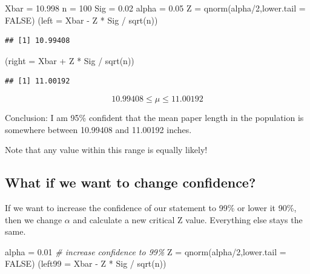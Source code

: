 \documentclass[
]{book}
\newenvironment{Shaded}{\begin{snugshade}}{\end{snugshade}}
\newcommand{\AttributeTok}[1]{\textcolor[rgb]{0.77,0.63,0.00}{#1}}
\newcommand{\CommentTok}[1]{\textcolor[rgb]{0.56,0.35,0.01}{\textit{#1}}}
\newcommand{\ConstantTok}[1]{\textcolor[rgb]{0.00,0.00,0.00}{#1}}
\newcommand{\DecValTok}[1]{\textcolor[rgb]{0.00,0.00,0.81}{#1}}
\newcommand{\FloatTok}[1]{\textcolor[rgb]{0.00,0.00,0.81}{#1}}
\newcommand{\FunctionTok}[1]{\textcolor[rgb]{0.00,0.00,0.00}{#1}}
\newcommand{\NormalTok}[1]{#1}
\newcommand{\OtherTok}[1]{\textcolor[rgb]{0.56,0.35,0.01}{#1}}
\newcommand{\SpecialCharTok}[1]{\textcolor[rgb]{0.00,0.00,0.00}{#1}}
\begin{document}
\begin{Shaded}
\begin{Highlighting}[]
\NormalTok{Xbar }\OtherTok{=} \FloatTok{10.998}
\NormalTok{n }\OtherTok{=} \DecValTok{100}
\NormalTok{Sig }\OtherTok{=} \FloatTok{0.02}
\NormalTok{alpha }\OtherTok{=} \FloatTok{0.05}
\NormalTok{Z }\OtherTok{=} \FunctionTok{qnorm}\NormalTok{(alpha}\SpecialCharTok{/}\DecValTok{2}\NormalTok{,}\AttributeTok{lower.tail =} \ConstantTok{FALSE}\NormalTok{)}
\NormalTok{(}\AttributeTok{left =}\NormalTok{ Xbar }\SpecialCharTok{{-}}\NormalTok{ Z }\SpecialCharTok{*}\NormalTok{ Sig }\SpecialCharTok{/} \FunctionTok{sqrt}\NormalTok{(n))}
\end{Highlighting}
\end{Shaded}

\begin{verbatim}
## [1] 10.99408
\end{verbatim}

\begin{Shaded}
\begin{Highlighting}[]
\NormalTok{(}\AttributeTok{right =}\NormalTok{ Xbar }\SpecialCharTok{+}\NormalTok{ Z }\SpecialCharTok{*}\NormalTok{ Sig }\SpecialCharTok{/} \FunctionTok{sqrt}\NormalTok{(n))}
\end{Highlighting}
\end{Shaded}

\begin{verbatim}
## [1] 11.00192
\end{verbatim}

\[ 10.99408 \leq \mu \leq 11.00192 \]

Conclusion: I am 95\% confident that the mean paper length in the population is somewhere between 10.99408 and 11.00192 inches.

Note that any value within this range is equally likely!

\hypertarget{what-if-we-want-to-change-confidence}{%
\subsection{What if we want to change confidence?}\label{what-if-we-want-to-change-confidence}}

If we want to increase the confidence of our statement to 99\% or lower it 90\%, then we change \(\alpha\) and calculate a new critical Z value. Everything else stays the same.

\begin{Shaded}
\begin{Highlighting}[]
\NormalTok{alpha }\OtherTok{=} \FloatTok{0.01} \CommentTok{\# increase confidence to 99\%}
\NormalTok{Z }\OtherTok{=} \FunctionTok{qnorm}\NormalTok{(alpha}\SpecialCharTok{/}\DecValTok{2}\NormalTok{,}\AttributeTok{lower.tail =} \ConstantTok{FALSE}\NormalTok{)}
\NormalTok{(}\AttributeTok{left99 =}\NormalTok{ Xbar }\SpecialCharTok{{-}}\NormalTok{ Z }\SpecialCharTok{*}\NormalTok{ Sig }\SpecialCharTok{/} \FunctionTok{sqrt}\NormalTok{(n))}
\end{Highlighting}
\end{Shaded}
\end{document}
